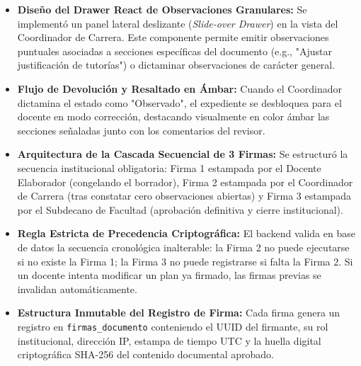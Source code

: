 \documentclass[12pt,a4paper]{article}
\begin{document}
\begin{itemize}[leftmargin=1.5em, itemsep=4pt]
    \item \textbf{Diseño del Drawer React de Observaciones Granulares:} Se implementó un panel lateral deslizante (\textit{Slide-over Drawer}) en la vista del Coordinador de Carrera. Este componente permite emitir observaciones puntuales asociadas a secciones específicas del documento (e.g., "Ajustar justificación de tutorías") o dictaminar observaciones de carácter general.
    \item \textbf{Flujo de Devolución y Resaltado en Ámbar:} Cuando el Coordinador dictamina el estado como "Observado", el expediente se desbloquea para el docente en modo corrección, destacando visualmente en color ámbar las secciones señaladas junto con los comentarios del revisor.
    \item \textbf{Arquitectura de la Cascada Secuencial de 3 Firmas:} Se estructuró la secuencia institucional obligatoria: Firma 1 estampada por el Docente Elaborador (congelando el borrador), Firma 2 estampada por el Coordinador de Carrera (tras constatar cero observaciones abiertas) y Firma 3 estampada por el Subdecano de Facultad (aprobación definitiva y cierre institucional).
    \item \textbf{Regla Estricta de Precedencia Criptográfica:} El backend valida en base de datos la secuencia cronológica inalterable: la Firma 2 no puede ejecutarse si no existe la Firma 1; la Firma 3 no puede registrarse si falta la Firma 2. Si un docente intenta modificar un plan ya firmado, las firmas previas se invalidan automáticamente.
    \item \textbf{Estructura Inmutable del Registro de Firma:} Cada firma genera un registro en \texttt{firmas\_\allowbreak   documento} conteniendo el UUID del firmante, su rol institucional, dirección IP, estampa de tiempo UTC y la huella digital criptográfica SHA-256 del contenido documental aprobado.
\end{itemize}
\end{document}
